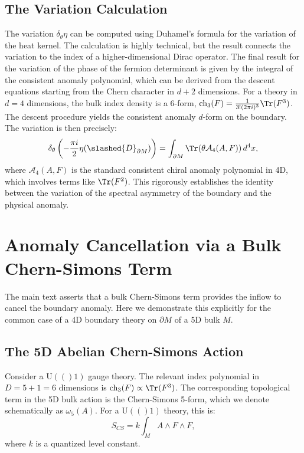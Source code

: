 \documentclass[11pt, letterpaper]{report}
\theoremstyle{plain} %
\theoremstyle{definition} %
\theoremstyle{remark} %
\newcommand{\BulkM}{M}
\newcommand{\BoundaryM}{\partial\BulkM}
\newcommand{\DiracOpBoundary}{\slashed{D}_{\BoundaryM}}
\newcommand{\EtaInv}{\eta}
\newcommand{\U}[1]{\mathrm{U}(#1)}
\begin{document}
\subsection{The Variation Calculation}
The variation $\delta_\theta \EtaInv$ can be computed using Duhamel's formula for the variation of the heat kernel. The calculation is highly technical, but the result connects the variation to the index of a higher-dimensional Dirac operator. The final result for the variation of the phase of the fermion determinant is given by the integral of the consistent anomaly polynomial, which can be derived from the descent equations starting from the Chern character in $d+2$ dimensions. For a theory in $d=4$ dimensions, the bulk index density is a 6-form, $\text{ch}_3(F) = \frac{1}{3!(2\pi i)^3}\Tr(F^3)$. The descent procedure yields the consistent anomaly $d$-form on the boundary. The variation is then precisely:
\begin{equation}
    \delta_\theta \left( -\frac{\pi i}{2} \EtaInv(\DiracOpBoundary) \right) = \int_{\BoundaryM} \Tr(\theta \mathcal{A}_4(A,F)) \, d^4x,
\end{equation}
where $\mathcal{A}_4(A,F)$ is the standard consistent chiral anomaly polynomial in 4D, which involves terms like $\Tr(F^2)$. This rigorously establishes the identity between the variation of the spectral asymmetry of the boundary and the physical anomaly.

\section{Anomaly Cancellation via a Bulk Chern-Simons Term}
\label{app:chern_simons_cancellation}

The main text asserts that a bulk Chern-Simons term provides the inflow to cancel the boundary anomaly. Here we demonstrate this explicitly for the common case of a 4D boundary theory on $\BoundaryM$ of a 5D bulk $\BulkM$.

\subsection{The 5D Abelian Chern-Simons Action}
Consider a $\U(1)$ gauge theory. The relevant index polynomial in $D=5+1=6$ dimensions is $\text{ch}_3(F) \propto \Tr(F^3)$. The corresponding topological term in the 5D bulk action is the Chern-Simons 5-form, which we denote schematically as $\omega_5(A)$. For a $\U(1)$ theory, this is:
\begin{equation}
    S_{CS} = k \int_{\BulkM} A \wedge F \wedge F,
\end{equation}
where $k$ is a quantized level constant.
\end{document}
